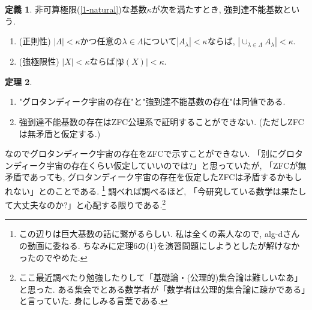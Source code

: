 \documentclass[dvipdfmx,a4paper,11pt]{article}
\theoremstyle{definition}
\newtheorem{thm}{定理}
\newtheorem{dfn}[thm]{定義}
\begin{document}
   \begin{tcolorbox}[
    colback = white,
    colframe = black!35!black,
    fonttitle = \bfseries,
    breakable = true]
    \begin{dfn}
非可算極限(\ref{1-natural})な基数$\kappa$が次を満たすとき, 強到達不能基数という.

\vspace{-13pt}
  \begin{enumerate}[label=(\alph*).]
 \setlength{\parskip}{0cm}
  \setlength{\itemsep}{0pt}
\item (正則性) $|\Lambda|<\kappa$かつ任意の$\lambda \in \Lambda$について$|A_{\lambda}|<\kappa$ならば, $|\cup_{\lambda \in \Lambda}A_{\lambda}|<\kappa$.
\item (強極限性) $|X| < \kappa$ならば$|\mathfrak{P}(X)|<\kappa$.
\end{enumerate}
    \end{dfn}
 \end{tcolorbox}
    \begin{tcolorbox}[
    colback = white,
    colframe = black!35!black,
    fonttitle = \bfseries,
    breakable = true]
    \begin{thm}
  \begin{enumerate}[label=(\arabic*).]
 \setlength{\parskip}{0cm}
  \setlength{\itemsep}{0pt}
\item "グロタンディーク宇宙の存在"と"強到達不能基数の存在"は同値である.
\item 強到達不能基数の存在はZFC公理系で証明することができない. (ただしZFCは無矛盾と仮定する.)
\end{enumerate}
    \end{thm}
 \end{tcolorbox}
 なのでグロタンディーク宇宙の存在をZFCで示すことができない. 
 「別にグロタンディーク宇宙の存在くらい仮定していいのでは?」と思っていたが,  「ZFCが無矛盾であっても, グロタンディーク宇宙の存在を仮定したZFCは矛盾するかもしれない」とのことである. 
 \footnote{この辺りは巨大基数の話に繋がるらしい. 私は全くの素人なので, alg-dさんの動画\cite{alg-4}に委ねる. ちなみに定理6の(1)を演習問題にしようとしたが解けなかったのでやめた.}
調べれば調べるほど, 「今研究している数学は果たして大丈夫なのか?」と心配する限りである.\footnote{ここ最近調べたり勉強したりして「基礎論・(公理的)集合論は難しいなあ」と思った. ある集会でとある数学者が「数学者は公理的集合論に疎かである」と言っていた. 身にしみる言葉である.}
 
 
 
 
 \newpage
 
\end{document}
